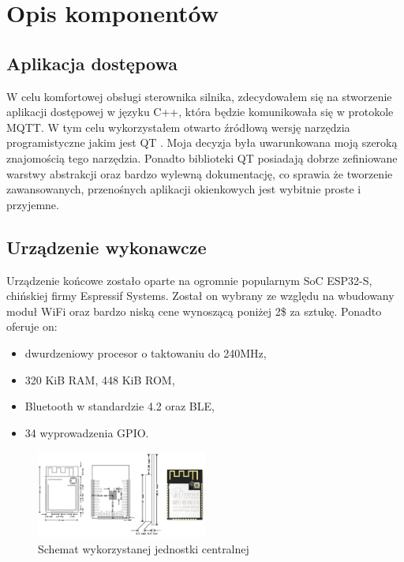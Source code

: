 \documentclass[eng, 11pt, twoside, openany]{mgr}
\begin{document}
    \section{Opis komponentów}

      \subsection{Aplikacja dostępowa}
        W celu komfortowej obsługi sterownika silnika,
        zdecydowałem się na stworzenie aplikacji dostępowej w 
        języku C++, która będzie komunikowała się w protokole MQTT.
        W tym celu wykorzystałem otwarto źródłową wersję narzędzia
        programistyczne jakim jest QT \cite{qt}. 
        Moja decyzja była uwarunkowana moją szeroką znajomością
        tego narzędzia. Ponadto biblioteki QT posiadają dobrze 
        zefiniowane warstwy abstrakcji oraz bardzo wylewną 
        dokumentację, co sprawia że tworzenie zawansowanych, 
        przenośnych aplikacji okienkowych jest wybitnie proste i 
        przyjemne. 

      \subsection{Urządzenie wykonawcze}
        Urządzenie końcowe zostało oparte na ogromnie popularnym
        SoC ESP32-S, chińskiej firmy Espressif Systems. 
        Został on wybrany ze względu na wbudowany moduł WiFi oraz
        bardzo niską cene wynoszącą poniżej 2\$ za sztukę. 
        Ponadto oferuje on:

        \begin{itemize}
          \item dwurdzeniowy procesor o taktowaniu do 240MHz,
          \item 320 KiB RAM, 448 KiB ROM,
          \item Bluetooth w standardzie 4.2 oraz BLE,
          \item 34 wyprowadzenia GPIO.
        \end{itemize}


        \begin{figure}[ht]
          \centering
          \includegraphics[width=0.5\textwidth]{img/esp32.jpg}
          \caption{Schemat wykorzystanej jednostki centralnej}
        \end{figure}
\end{document}
